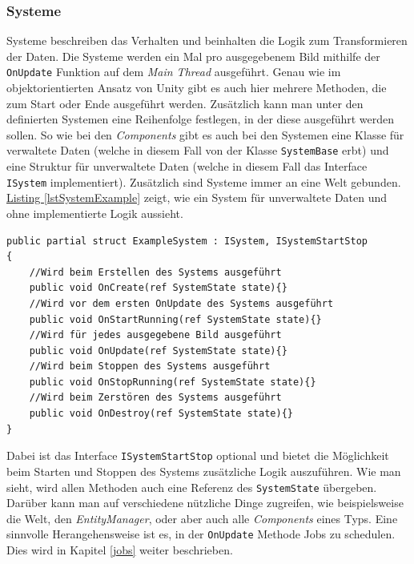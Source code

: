 \subsubsection[Systeme]{Systeme}
Systeme beschreiben das Verhalten und beinhalten die Logik zum Transformieren der Daten. Die Systeme werden ein Mal pro ausgegebenem Bild mithilfe der \texttt{OnUpdate} Funktion auf dem \textit{Main Thread} ausgeführt. Genau wie im objektorientierten Ansatz von Unity gibt es auch hier mehrere Methoden, die zum Start oder Ende ausgeführt werden. Zusätzlich kann man unter den definierten Systemen eine Reihenfolge festlegen, in der diese ausgeführt werden sollen. So wie bei den \textit{Components} gibt es auch bei den Systemen eine Klasse für verwaltete Daten (welche in diesem Fall von der Klasse \texttt{SystemBase} erbt) und eine Struktur für unverwaltete Daten (welche in diesem Fall das Interface \texttt{ISystem} implementiert). Zusätzlich sind Systeme immer an eine Welt gebunden. \hyperref[lstSystemExample]{Listing \ref*{lstSystemExample}} zeigt, wie ein System für unverwaltete Daten und ohne implementierte Logik aussieht.
\begin{lstlisting}[style=code, caption={[Beispiel eines Systems]Beispiel eines Systems. Das System hat verschiedene Methoden, welche zum Start beziehungsweise Ende ausgeführt werden und eine \texttt{OnUpdate} Methode. Diese wird einmal pro Bild ausgeführt.}, label=lstSystemExample]
public partial struct ExampleSystem : ISystem, ISystemStartStop
{
    //Wird beim Erstellen des Systems ausgeführt
    public void OnCreate(ref SystemState state){}
    //Wird vor dem ersten OnUpdate des Systems ausgeführt
    public void OnStartRunning(ref SystemState state){}
    //Wird für jedes ausgegebene Bild ausgeführt
    public void OnUpdate(ref SystemState state){}
    //Wird beim Stoppen des Systems ausgeführt
    public void OnStopRunning(ref SystemState state){}
    //Wird beim Zerstören des Systems ausgeführt
    public void OnDestroy(ref SystemState state){}
}
\end{lstlisting}
Dabei ist das Interface \texttt{ISystemStartStop} optional und bietet die Möglichkeit beim Starten und Stoppen des Systems zusätzliche Logik auszuführen. Wie man sieht, wird allen Methoden auch eine Referenz des \texttt{SystemState} übergeben. Darüber kann man auf verschiedene nützliche Dinge zugreifen, wie beispielsweise die Welt, den \textit{EntityManager}, oder aber auch alle \textit{Components} eines Typs. Eine sinnvolle Herangehensweise ist es, in der \texttt{OnUpdate} Methode Jobs zu schedulen. Dies wird in Kapitel \ref{jobs} weiter beschrieben.
